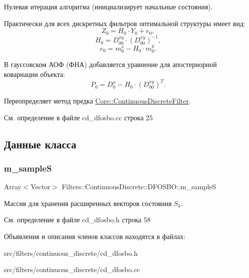 Нулевая итерация алгоритма (инициализирует начальные состояния). 

Практически для всех дискретных фильтров оптимальной структуры имеет вид\+: \[Z_0 = H_0 \cdot Y_0 + e_0,\] \[H_0 = D_{00}^{xy} \cdot (D_{00}^{xy})^{-1},\] \[e_0 = m_0^x - H_0 \cdot m_0^y.\]

В гауссовском АОФ (ФНА) добавляется уравнение для апостериорной ковариации объекта\+: \[P_0 = D_0^x - H_0 \cdot (D_{00}^{xy})^T.\] 

Переопределяет метод предка \hyperlink{class_core_1_1_continuous_discrete_filter_acc9b18241a13d46dc92ef1f02ec13e53}{Core\+::\+Continuous\+Discrete\+Filter}.



См. определение в файле cd\+\_\+dfosbo.\+cc строка 25



\subsection{Данные класса}
\hypertarget{class_filters_1_1_continuous_discrete_1_1_d_f_o_s_b_o_affccb91872f23878db490d487c481606}{}\label{class_filters_1_1_continuous_discrete_1_1_d_f_o_s_b_o_affccb91872f23878db490d487c481606} 
\subsubsection{\texorpdfstring{m\+\_\+sampleS}{m\_sampleS}}
{\footnotesize\ttfamily Array$<$Vector$>$ Filters\+::\+Continuous\+Discrete\+::\+D\+F\+O\+S\+B\+O\+::m\+\_\+sampleS\hspace{0.3cm}{\ttfamily [protected]}}

Массив для хранения расширенных векторов состояния $S_k$. 

См. определение в файле cd\+\_\+dfosbo.\+h строка 58



Объявления и описания членов классов находятся в файлах\+:\begin{DoxyCompactItemize}
\item 
src/filters/continuous\+\_\+discrete/cd\+\_\+dfosbo.\+h\item 
src/filters/continuous\+\_\+discrete/cd\+\_\+dfosbo.\+cc\end{DoxyCompactItemize}

